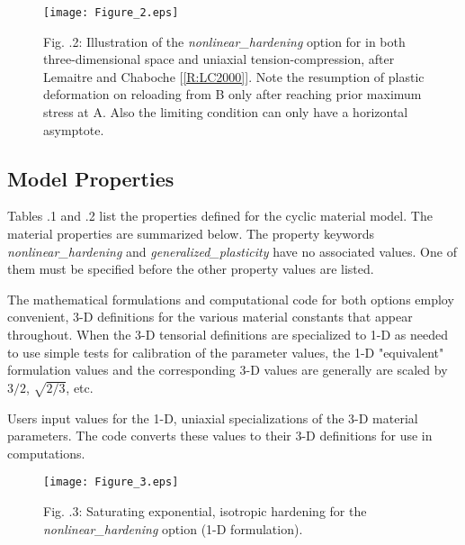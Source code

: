 \documentclass[11pt]{report}
\numberwithin{equation}{section}
\begin{document}
\begin{figure}[htb]
\begin{center}
\texttt{[image: Figure\_2.eps]} 
\caption*{\small Fig. \thesection.2: Illustration of the \textit{nonlinear\_hardening} option for 
in both three-dimensional space and uniaxial tension-compression,
after Lemaitre and Chaboche [\ref{R:LC2000}]. Note the
resumption of plastic deformation on reloading
from B only after reaching prior maximum stress at A. 
Also the limiting condition can only have a horizontal asymptote. \normalsize}\label{fig10}

\end{center}
\end{figure}

\subsection {Model Properties}
Tables \thesection.1 and \thesection.2 list the properties defined for the 
cyclic material model. The material properties are summarized below.
The property keywords \textit{nonlinear\_hardening} and 
\textit{generalized\_plasticity}
have no associated values. One of them must be specified before the other
property values are listed.

The mathematical formulations and 
computational code for both options employ convenient, 3-D
definitions for the various material constants that appear throughout.
When the 3-D tensorial definitions are specialized to 1-D as needed
to use simple tests for calibration of the parameter values, the 1-D
"equivalent" formulation values and the corresponding 3-D
values are generally are scaled by $3/2$, $\sqrt{2/3}$, etc.

Users input values for the 1-D, uniaxial 
specializations of the 3-D material parameters. The code converts these values
to their 3-D definitions for use in computations.
\begin{figure}[htb]
\begin{center}
\texttt{[image: Figure\_3.eps]} 

\caption*{\small Fig. \thesection.3: Saturating exponential, isotropic hardening for the
\textit{nonlinear\_hardening} option (1-D formulation).
\normalsize}

\end{center}
\end{figure}
\end{document}
